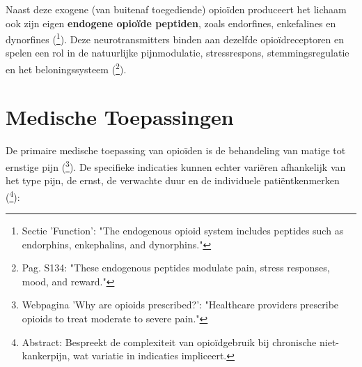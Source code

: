\documentclass[11pt, a4paper]{report} %
\begin{document}
Naast deze exogene (van buitenaf toegediende) opioïden produceert het lichaam ook zijn eigen \textbf{endogene opioïde peptiden}, zoals endorfines, enkefalines en dynorfines (\cite{StatPearlsOpioidReceptor}\footnote{Sectie 'Function': "The endogenous opioid system includes peptides such as endorphins, enkephalins, and dynorphins."}). Deze neurotransmitters binden aan dezelfde opioïdreceptoren en spelen een rol in de natuurlijke pijnmodulatie, stressrespons, stemmingsregulatie en het beloningssysteem (\cite{Trescot2008OpioidPharm}\footnote{Pag. S134: "These endogenous peptides modulate pain, stress responses, mood, and reward."}).

\section{Medische Toepassingen}
De primaire medische toepassing van opioïden is de behandeling van matige tot ernstige pijn (\cite{ClevelandClinicOpioids}\footnote{Webpagina 'Why are opioids prescribed?': "Healthcare providers prescribe opioids to treat moderate to severe pain."}). De specifieke indicaties kunnen echter variëren afhankelijk van het type pijn, de ernst, de verwachte duur en de individuele patiëntkenmerken (\cite{Kalso2004OpioidsChronicNonCancerPain}\footnote{Abstract: Bespreekt de complexiteit van opioïdgebruik bij chronische niet-kankerpijn, wat variatie in indicaties impliceert.}):
\end{document}
